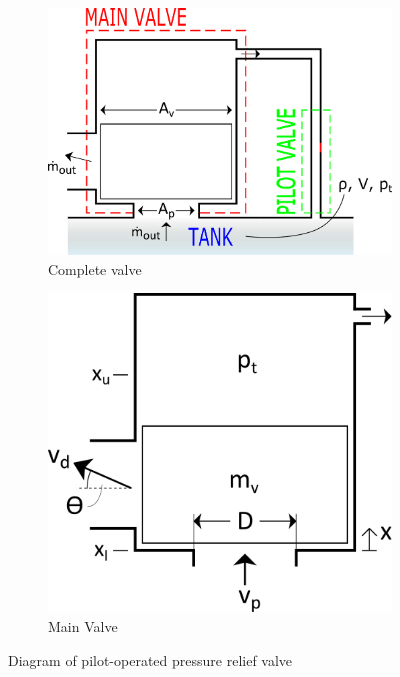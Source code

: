\begin{figure}[ht]
    \begin{subfigure}{0.59\textwidth}
    \centering
    \includegraphics[width=\textwidth]{Diagrams/ValveClosing/Diagram.png}
    \caption{Complete valve}
    \label{fig: DiagramComp}
    \end{subfigure}
    \hfill
    \begin{subfigure}{0.4\textwidth}
    \centering
    \includegraphics[width=\textwidth]{Diagrams/ValveClosing/Diagram-Main.png}
    \caption{Main Valve}
    \label{fig: DiagramMain}
    \end{subfigure}
    \caption{Diagram of pilot-operated pressure relief valve}
    \label{fig: Diagram}
\end{figure}